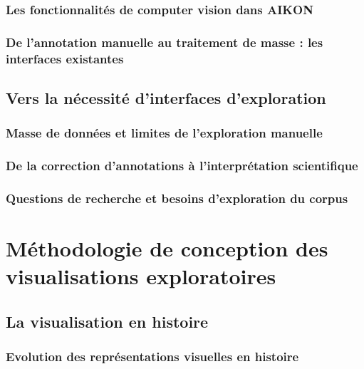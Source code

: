\documentclass[a4paper,12pt,twoside]{book}
\newcommand{\clearemptydoublepage}{\newpage{\pagestyle{empty}\cleardoublepage}}
\begin{document}
	 
	


	
	\section{Les fonctionnalités de computer vision dans AIKON}
	
	
	\section{De l'annotation manuelle au traitement de masse : les interfaces existantes}
	
	
	\clearemptydoublepage
	
	\chapter{Vers la nécessité d'interfaces d'exploration}
	\section{Masse de données et limites de l'exploration manuelle}
	
	
	\section{De la correction d'annotations à l'interprétation scientifique}
	
	
	\section{Questions de recherche et besoins d'exploration du corpus}
	
	
	\clearemptydoublepage
	
	
	\part{Méthodologie de conception des visualisations exploratoires}
	\chapter{La visualisation en histoire}
	\section{Evolution des représentations visuelles en histoire}
	
	
\end{document}

